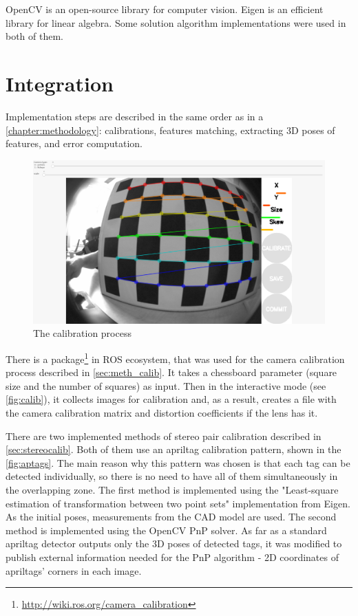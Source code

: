 OpenCV \cite{opencv} is an open-source library for computer vision.
Eigen \cite{Eigen} is an efficient library for linear algebra.
Some solution algorithm implementations were used in both of them.

\section{Integration}
\label{sec:impl_integration}

Implementation steps are described in the same order as in a \autoref{chapter:methodology}: calibrations, features matching, extracting 3D poses of features, and error computation.

\begin{figure}[h]
    \centering
    \includegraphics[width=.6\textwidth]{graphics/calibration.png}
    \caption{The calibration process}
    \label{fig:calib}
\end{figure}

There is a package\footnote{\url{http://wiki.ros.org/camera_calibration}} in ROS ecosystem, that was used for the camera calibration process described in \autoref{sec:meth_calib}. 
It takes a chessboard parameter (square size and the number of squares) as input.
Then in the interactive mode (see \autoref{fig:calib}), it collects images for calibration and, as a result, creates a file with the camera calibration matrix and distortion coefficients if the lens has it.

There are two implemented methods of stereo pair calibration described in \autoref{sec:stereocalib}.
Both of them use an apriltag calibration pattern, shown in the \autoref{fig:aptags}.
The main reason why this pattern was chosen is that each tag can be detected individually, so there is no need to have all of them simultaneously in the overlapping zone.
The first method is implemented using the "Least-square estimation of transformation between two point sets" \cite{Umeyama1991} implementation from Eigen.
As the initial poses, measurements from the CAD model are used.
The second method is implemented using the OpenCV PnP solver.
As far as a standard apriltag detector outputs only the 3D poses of detected tags, it was modified to publish external information needed for the PnP algorithm - 2D coordinates of apriltags' corners in each image.

